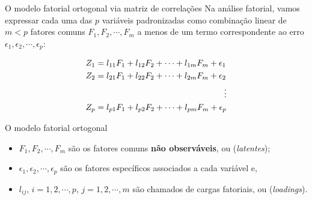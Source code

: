 \documentclass[
  ignorenonframetext,
  aspectratio=169,
]{beamer}
\providecommand{\tightlist}{%
  \setlength{\itemsep}{0pt}\setlength{\parskip}{0pt}}
\begin{document}
\begin{frame}{O modelo fatorial ortogonal via matriz de correlações}
\label{o-modelo-fatorial-ortogonal-via-matriz-de-correlauxe7uxf5es-2}
Na análise fatorial, vamos expressar cada uma das \(p\) variáveis
padronizadas como combinação linear de \(m < p\) fatores comuns
\(F_1, F_2, \cdots, F_m\) a menos de um termo correspondente ao erro
\(\epsilon_1, \epsilon_2, \cdots, \epsilon_p\):

\[
\begin{aligned}
Z_1 &= l_{11}F_1 + l_{12}F_2 + \cdots + l_{1m}F_m + \epsilon_1 \\
Z_2 &= l_{21}F_1 + l_{22}F_2 + \cdots + l_{2m}F_m + \epsilon_2 \\ && \hspace{-25cm} \vdots \\
Z_p &= l_{p1}F_1 + l_{p2}F_2 + \cdots + l_{pm}F_m + \epsilon_p 
\end{aligned}
\]
\end{frame}

\begin{frame}{O modelo fatorial ortogonal}
\label{o-modelo-fatorial-ortogonal}
\begin{itemize}
\tightlist
\item
  \(F_1, F_2, \cdots, F_m\) são os fatores comuns \textbf{não
  observáveis}, ou (\emph{latentes});
\end{itemize}

\vspace{0.5cm}

\begin{itemize}
\tightlist
\item
  \(\epsilon_1, \epsilon_2, \cdots,\epsilon_p\) são os fatores
  específicos associados a cada variável e,
\end{itemize}

\vspace{0.5cm}

\begin{itemize}
\tightlist
\item
  \(l_{ij}\), \(i = 1, 2, \cdots,p\), \(j = 1, 2, \cdots, m\) são
  chamados de cargas fatoriais, ou (\emph{loadings}).
\end{itemize}
\end{frame}
\end{document}
